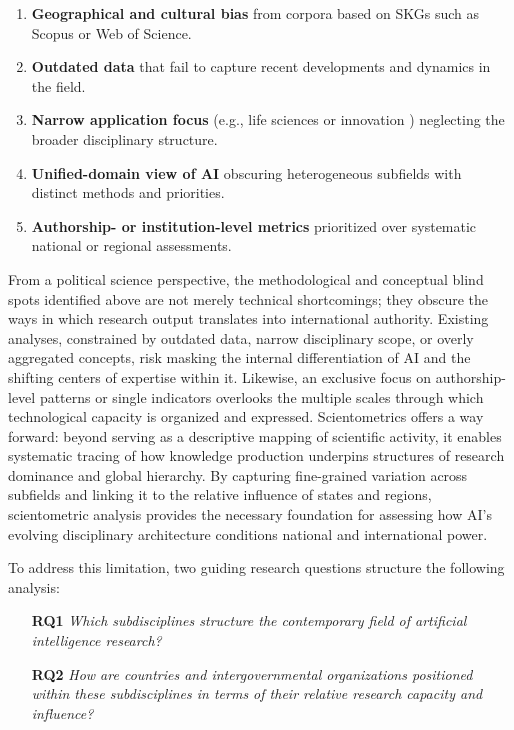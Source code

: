 \documentclass{article}
\begin{document}
\begin{enumerate}
	\item \textbf{Geographical and cultural bias} from corpora based on SKGs such as Scopus or Web of Science. \cite{almarzouqi2024comparative, ozkaya2023analysis, hellwig2019ai}
	\item \textbf{Outdated data} that fail to capture recent developments and dynamics in the field. \cite{niu2016global}
	\item \textbf{Narrow application focus} (e.g., life sciences \cite{schmallenbach2024global} or innovation \cite{mariani2023artificial}) neglecting the broader disciplinary structure.
	\item \textbf{Unified-domain view of AI} obscuring heterogeneous subfields with distinct methods and priorities. \cite{almarzouqi2024comparative, cao2020international, vinayak2023signatures, alshebli2022beijing, hu2020global}
	\item \textbf{Authorship- or institution-level metrics} prioritized over systematic national or regional assessments. \cite{niu2016global, klinger2020narrowing}
\end{enumerate}

From a political science perspective, the methodological and conceptual blind spots identified above are not merely technical shortcomings; they obscure the ways in which research output translates into international authority. Existing analyses, constrained by outdated data, narrow disciplinary scope, or overly aggregated concepts, risk masking the internal differentiation of AI and the shifting centers of expertise within it. Likewise, an exclusive focus on authorship-level patterns or single indicators overlooks the multiple scales through which technological capacity is organized and expressed. Scientometrics offers a way forward: beyond serving as a descriptive mapping of scientific activity, it enables systematic tracing of how knowledge production underpins structures of research dominance and global hierarchy. By capturing fine-grained variation across subfields and linking it to the relative influence of states and regions, scientometric analysis provides the necessary foundation for assessing how AI’s evolving disciplinary architecture conditions national and international power.

To address this limitation, two guiding research questions structure the following analysis:

\begin{enumerate}
	\item[\textbf{RQ1}] \emph{Which subdisciplines structure the contemporary field of artificial intelligence research?}
	\item[\textbf{RQ2}] \emph{How are countries and intergovernmental organizations positioned within these subdisciplines in terms of their relative research capacity and influence?}
\end{enumerate}
\end{document}
